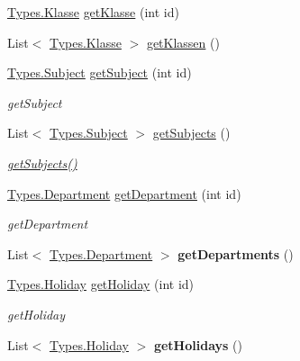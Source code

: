 \begin{DoxyCompactItemize}
\item 
\hyperlink{struct_webuntis_a_p_i_1_1_types_1_1_klasse}{Types.\-Klasse} \hyperlink{class_webuntis_a_p_i_1_1_web_untis_a_p_i_ad9f81e68ec2e53ddb3538a1386f1e285}{get\-Klasse} (int id)
\item 
List$<$ \hyperlink{struct_webuntis_a_p_i_1_1_types_1_1_klasse}{Types.\-Klasse} $>$ \hyperlink{class_webuntis_a_p_i_1_1_web_untis_a_p_i_af4d855ceab062d121b86c73ec6d963af}{get\-Klassen} ()
\item 
\hyperlink{struct_webuntis_a_p_i_1_1_types_1_1_subject}{Types.\-Subject} \hyperlink{class_webuntis_a_p_i_1_1_web_untis_a_p_i_a4ba48e849228d5b2403dc06f1430f41a}{get\-Subject} (int id)
\begin{DoxyCompactList}\small\item\em get\-Subject \end{DoxyCompactList}\item 
List$<$ \hyperlink{struct_webuntis_a_p_i_1_1_types_1_1_subject}{Types.\-Subject} $>$ \hyperlink{class_webuntis_a_p_i_1_1_web_untis_a_p_i_a6e81b3b45aede6785f256bf4804a0e16}{get\-Subjects} ()
\begin{DoxyCompactList}\small\item\em \hyperlink{class_webuntis_a_p_i_1_1_web_untis_a_p_i_a6e81b3b45aede6785f256bf4804a0e16}{get\-Subjects()} \end{DoxyCompactList}\item 
\hyperlink{struct_webuntis_a_p_i_1_1_types_1_1_department}{Types.\-Department} \hyperlink{class_webuntis_a_p_i_1_1_web_untis_a_p_i_a779a92b63fa946f6f78443c73288a47d}{get\-Department} (int id)
\begin{DoxyCompactList}\small\item\em get\-Department \end{DoxyCompactList}\item 
\hypertarget{class_webuntis_a_p_i_1_1_web_untis_a_p_i_a6283a2b844c88aba6121312691b561c4}{List$<$ \hyperlink{struct_webuntis_a_p_i_1_1_types_1_1_department}{Types.\-Department} $>$ {\bfseries get\-Departments} ()}\label{class_webuntis_a_p_i_1_1_web_untis_a_p_i_a6283a2b844c88aba6121312691b561c4}

\item 
\hyperlink{struct_webuntis_a_p_i_1_1_types_1_1_holiday}{Types.\-Holiday} \hyperlink{class_webuntis_a_p_i_1_1_web_untis_a_p_i_a345622fe756645e9922802172386650b}{get\-Holiday} (int id)
\begin{DoxyCompactList}\small\item\em get\-Holiday \end{DoxyCompactList}\item 
\hypertarget{class_webuntis_a_p_i_1_1_web_untis_a_p_i_adcadbeb03e548258501c3f095375375a}{List$<$ \hyperlink{struct_webuntis_a_p_i_1_1_types_1_1_holiday}{Types.\-Holiday} $>$ {\bfseries get\-Holidays} ()}\label{class_webuntis_a_p_i_1_1_web_untis_a_p_i_adcadbeb03e548258501c3f095375375a}


\end{DoxyCompactItemize}
